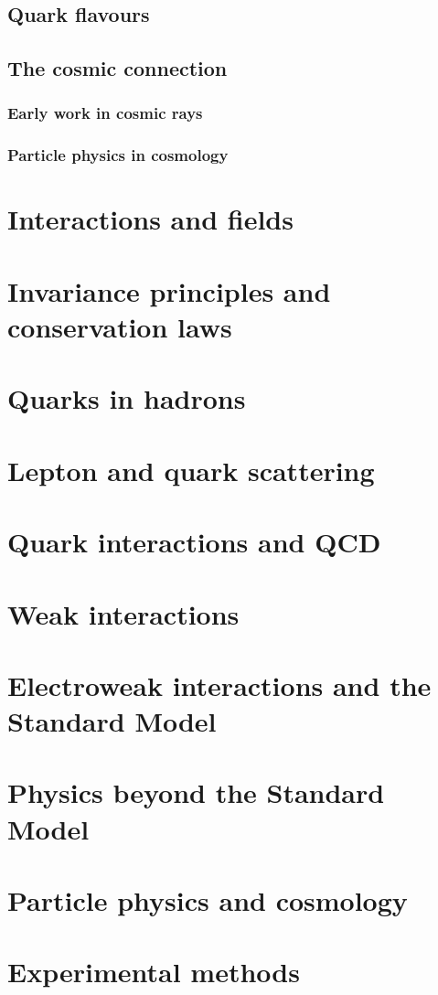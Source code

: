 \documentclass[en, device=normal]{elegantnote}
\begin{document}
\subsection{Quark flavours}

\subsection{The cosmic connection}

\subsubsection{Early work in cosmic rays}

\subsubsection{Particle physics in cosmology}

\section{Interactions and fields}

\section{Invariance principles and conservation laws}

\section{Quarks in hadrons}

\section{Lepton and quark scattering}

\section{Quark interactions and QCD}

\section{Weak interactions}

\section{Electroweak interactions and the Standard Model}

\section{Physics beyond the Standard Model}

\section{Particle physics and cosmology}

\section{Experimental methods}
\end{document}
